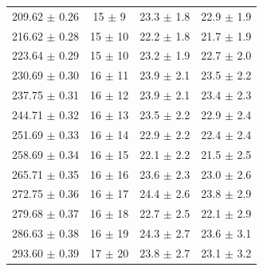 \begin{table}[p]
\begin{tabular}{c c c c}
    209.62 $\pm$ 0.26 & 15 $\pm$ 9 & 23.3  $\pm$ 1.8 & 22.9 $\pm$ 1.9 \\
    216.62 $\pm$ 0.28 & 15 $\pm$ 10 & 22.2 $\pm$ 1.8 & 21.7 $\pm$ 1.9 \\
    223.64 $\pm$ 0.29 & 15 $\pm$ 10 & 23.2 $\pm$ 1.9 & 22.7 $\pm$ 2.0 \\
    230.69 $\pm$ 0.30 & 16 $\pm$ 11 & 23.9 $\pm$ 2.1 & 23.5 $\pm$ 2.2 \\
    237.75 $\pm$ 0.31 & 16 $\pm$ 12 & 23.9 $\pm$ 2.1 & 23.4 $\pm$ 2.3 \\
    244.71 $\pm$ 0.32 & 16 $\pm$ 13 & 23.5 $\pm$ 2.2 & 22.9 $\pm$ 2.4 \\
    251.69 $\pm$ 0.33 & 16 $\pm$ 14 & 22.9 $\pm$ 2.2 & 22.4 $\pm$ 2.4 \\
    258.69 $\pm$ 0.34 & 16 $\pm$ 15 & 22.1 $\pm$ 2.2 & 21.5 $\pm$ 2.5 \\
    265.71 $\pm$ 0.35 & 16 $\pm$ 16 & 23.6 $\pm$ 2.3 & 23.0 $\pm$ 2.6 \\
    272.75 $\pm$ 0.36 & 16 $\pm$ 17 & 24.4 $\pm$ 2.6 & 23.8 $\pm$ 2.9 \\
    279.68 $\pm$ 0.37 & 16 $\pm$ 18 & 22.7 $\pm$ 2.5 & 22.1 $\pm$ 2.9 \\
    286.63 $\pm$ 0.38 & 16 $\pm$ 19 & 24.3 $\pm$ 2.7 & 23.6 $\pm$ 3.1 \\
    293.60 $\pm$ 0.39 & 17 $\pm$ 20 & 23.8 $\pm$ 2.7 & 23.1 $\pm$ 3.2 \\
    \bottomrule
  \end{tabular}
\end{table}

